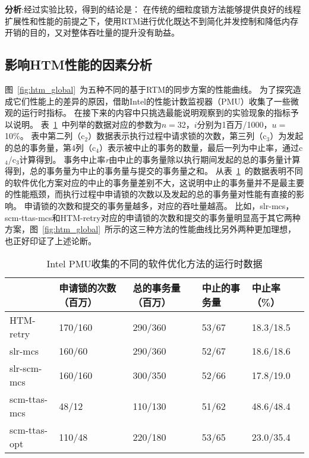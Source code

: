 \textbf{分析}:经过实验比较，得到的结论是：
在传统的细粒度锁方法能够提供良好的线程扩展性和性能的前提之下，使用RTM进行优化既达不到简化并发控制和降低内存开销的目的，又对整体吞吐量的提升没有助益。

\subsection{影响HTM性能的因素分析}
\label{sec:htm_analysis}

图~\ref{fig:htm_global}~为五种不同的基于RTM的同步方案的性能曲线。
为了探究造成它们性能上的差异的原因，借助Intel的性能计数监视器（PMU）收集了一些微观的运行时指标。
在接下来的内容中只挑选最能说明观察到的实验现象的指标予以说明。
表~\ref{tab:htm_abort_rate}~中列举的数据对应的参数为$n = $32，$i$分别为1百万/1000，$u = $10\%。
表中第二列（c$_2$）数据表示执行过程中请求锁的次数，第三列（c$_3$）为发起的总的事务量，第4列（c$_4$）表示被中止的事务的数量，最后一列为中止率，通过c$_4$/c$_3$计算得到。
事务中止率\textit{r}由中止的事务量除以执行期间发起的总的事务量计算得到，总的事务量为中止的事务量与提交的事务量之和。
从表~\ref{tab:htm_abort_rate}~的数据表明不同的软件优化方案对应的中止的事务量差别不大，这说明中止的事务量并不是最主要的性能瓶颈，而执行过程中申请锁的次数以及发起的总的事务量对性能有直接的影响。
申请锁的次数和提交的事务量越多，对应的吞吐量越高。
比如，slr-mcs，scm-ttas-mcs和HTM-retry对应的申请锁的次数和提交的事务量明显高于其它两种方案，图~\ref{fig:htm_global}~所示的这三种方法的性能曲线比另外两种更加理想，也正好印证了上述论断。

\begin{table}[htbp]
  \centering
  \caption{Intel PMU收集的不同的软件优化方法的运行时数据}
  \label{tab:htm_abort_rate}
  \begin{tabular}{lllll}
    \toprule
                  & 申请锁的次数（百万） & 总的事务量（百万） & 中止的事务量 & 中止率（\%） \\
    \midrule
      HTM-retry   & 170/160           & 290/360         & 53/67      & 18.3/18.5 \\
      slr-mcs     & 160/60            & 290/360         & 52/67      & 18.6/18.6 \\
      slr-scm-mcs & 160/160           & 300/350         & 52/66      & 17.8/19.0 \\
      scm-ttas-mcs& 48/12             & 110/130         & 51/62      & 48.6/48.4 \\
      scm-ttas-opt& 110/48            & 220/180         & 53/65      & 23.0/35.4 \\
    \bottomrule
  \end{tabular}
\end{table}

